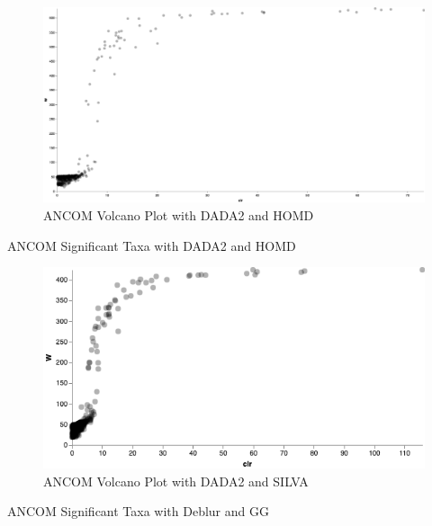 \documentclass[a4paper]{article}
\begin{document}
            \begin{figure}[p]
                \centering
                \includegraphics[width=0.8 \linewidth]{figures/ANCOM/DADA2.silva.png}
                \caption{ANCOM Volcano Plot with DADA2 and HOMD}
                \label{fig:volcano-dada2-silva}
            \end{figure}

            \begin{table}[p]
                \centering
                \caption{ANCOM Significant Taxa with DADA2 and HOMD}
                \label{tb:ANCOM-dada2-homd}

            \end{table}

            \begin{figure}[p]
                \centering
                \includegraphics[width=0.8 \linewidth]{figures/ANCOM/DADA2.homd.png}
                \caption{ANCOM Volcano Plot with DADA2 and SILVA}
                \label{fig:volcano-dada2-homd}
            \end{figure}

            \begin{table}[p]
                \centering
                \caption{ANCOM Significant Taxa with Deblur and GG}
                \label{tb:ANCOM-deblur-gg}

            \end{table}
\end{document}
